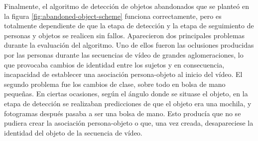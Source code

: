 Finalmente, el algoritmo de detección de objetos abandonados que se planteó en la figura \ref{fig:abandoned-object-scheme} funciona correctamente, pero es totalmente dependiente de que la etapa de detección y la etapa de seguimiento de personas y objetos se realicen sin fallos. Aparecieron dos principales problemas durante la evaluación del algoritmo. Uno de ellos fueron las oclusiones producidas por las personas durante las secuencias de vídeo de grandes aglomeraciones, lo que provocaba cambios de identidad entre los sujetos y en consecuencia, incapacidad de establecer una asociación persona-objeto al inicio del vídeo. El segundo problema fue los cambios de clase, sobre todo en bolsa de mano pequeñas. En ciertas ocasiones, según el ángulo donde se situase el objeto, en la etapa de detección se realizaban predicciones de que el objeto era una mochila, y fotogramas después pasaba a ser una bolsa de mano. Esto producía que no se pudiera crear la asociación persona-objeto o que, una vez creada, desapareciese la identidad del objeto de la secuencia de vídeo.
